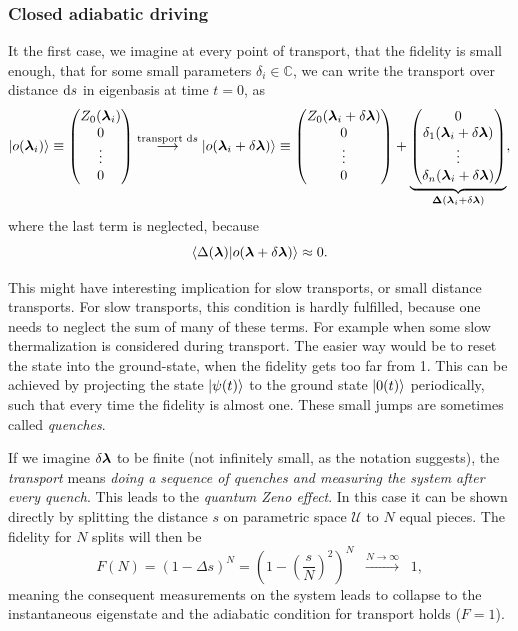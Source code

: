 \subsubsection{Closed adiabatic driving}
It the first case, we imagine at every point of transport, that the fidelity is small enough, that for some small parameters $\delta_i\in \mathbb{C}$, we can write the transport over distance $\mathrm{d} s$ in eigenbasis at time $t=0$, as
$$\ket{o({\bm\lambda}_i)}\equiv \begin{pmatrix}
    Z_0({\bm\lambda}_i)\\
    0\\
    \vdots \\
    0
\end{pmatrix} \overset{\text{transport }\mathrm{d} s}{\longrightarrow} \ket{o({\bm\lambda}_i+\delta {\bm\lambda})}\equiv\begin{pmatrix}
    Z_0({\bm\lambda}_i+\delta {\bm\lambda})\\
    0\\
    \vdots \\
    0
\end{pmatrix} +\underbrace{\begin{pmatrix}
    0\\
    \delta_1({\bm\lambda}_i+\delta {\bm\lambda})\\
    \vdots \\
    \delta_n({\bm\lambda}_i+\delta {\bm\lambda})
\end{pmatrix}}_{\mathbf{\Delta}({\bm\lambda}_i+\delta {\bm\lambda})}, $$
where the last term is neglected, because
$$\braket{\Delta({\bm\lambda})|o({\bm\lambda}+\delta{\bm\lambda})}\approx 0.$$

This might have interesting implication for slow transports, or small distance transports. For slow transports, this condition is hardly fulfilled, because one needs to neglect the sum of many of these terms. For example when some slow thermalization is considered during transport. The easier way would be to reset the state into the ground-state, when the fidelity gets too far from 1. This can be achieved by projecting the state $\ket{\psi(t)}$ to the ground state $\ket{0(t)}$ periodically, such that every time the fidelity is almost one. These small jumps are sometimes called \emph{quenches}. 






If we imagine $\delta{\bm\lambda}$ to be finite (not infinitely small, as the notation suggests), the \emph{transport} means \emph{doing a sequence of quenches and measuring the system after every quench}. This leads to the \emph{quantum Zeno effect}. In this case it can be shown directly by splitting the distance $s$ on parametric space $\mathcal U$ to $N$ equal pieces. The fidelity for $N$ splits will then be
\begin{equation}
    F(N)=(1-\Delta s)^N=\left(1-\left(\frac{s}{N}\right)^2\right)^N \;\;\overset{N\rightarrow\infty}{\longrightarrow}\;\; 1,
\end{equation}
meaning the consequent measurements on the system leads to collapse to the instantaneous eigenstate and the adiabatic condition for transport holds ($F=1$). 

